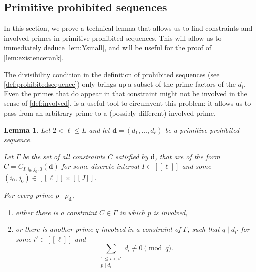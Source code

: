 \documentclass[11pt]{amsart}
\newtheorem{lemma}[theorem]{Lemma}
\theoremstyle{definition}
\renewcommand{\leq}{\leqslant}
\newcommand{\sinterval}[1]{[\![#1]\!] }
\renewcommand{\d}{\boldsymbol{d}}
\newcommand{\fprod}[1]{\rho_{#1}}
\newcommand{\pall}{\fprod{\d}}
\newcommand{\ellp}{\ell}
\newcommand{\elln}{L}
\newcommand{\newR}{\sinterval{J}}
\newcommand{\mprimeone}{p}
\newcommand{\mprimetwo}{q}
\begin{document}
\subsection{Primitive prohibited sequences}
\label{sec:primitiveanalysis}
In this section, we prove a technical lemma that allows us to find constraints and involved primes in primitive prohibited sequences. This will allow us to immediately deduce \cref{lem:Ysmall}, and will be useful for the proof of \cref{lem:existencerank}. 

The divisibility condition in the definition of prohibited sequences (see \cref{def:prohibitedsequence}) only brings up a subset of the prime factors of the $d_i$. Even the primes that do appear in that constraint might not be involved in the sense of \cref{def:involved}.  is a useful tool to circumvent this problem: it allows us to pass from an arbitrary prime to a (possibly different) involved prime. 

\begin{lemma}
\label{lem:prohibitedanalysis2}
Let $2<\ellp\leq \elln$ and let $\d = (d_1, \ldots, d_{\ellp})$ be a primitive prohibited sequence. 

Let $\Gamma$ be the set of all constraints $C$ satisfied by $\d$, that are of the form $C = C_{I,i_0,j_0,0}(\d)$ for some discrete interval $I\subset \sinterval{\ellp}$ and some $(i_0,j_0)\in \sinterval{\ellp} \!\times\! \newR$.

For every prime $\mprimeone\mid \pall$, 
\begin{enumerate}
	\item \label{item:prohibitedanalysis1} either there is a constraint $C \in \Gamma$ in which $\mprimeone$ is involved,
	\item \label{item:prohibitedanalysis2} or there is another prime $\mprimetwo$ involved in a constraint of $\Gamma$, such that $\mprimetwo \mid d_{i'}$ for some $i'\in \sinterval{\ellp}$ and
	\begin{equation*}
		\sum_{\substack{1\leq i <i'\\ \mprimeone\mid d_i}} d_i \not\equiv 0 \pmod \mprimetwo.
	\end{equation*}
\end{enumerate}
\end{lemma}
\end{document}
